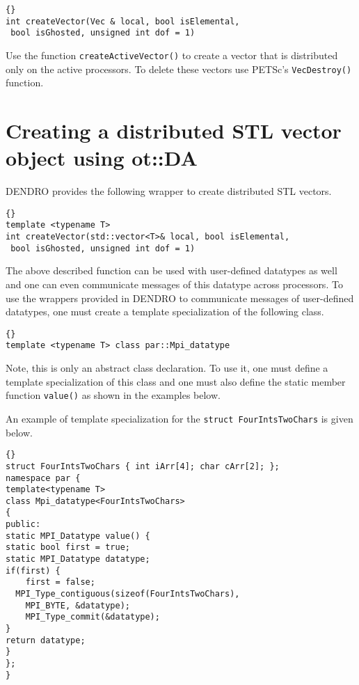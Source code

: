 \documentclass[12pt,reqno,a4paper]{report}
\numberwithin{equation}{section}
\begin{document}
\begin{lstlisting}[frame=trbl, fontadjust]{}
int createVector(Vec & local, bool isElemental,
 bool isGhosted, unsigned int dof = 1)
\end{lstlisting}

Use the function \lstinline[basicstyle=\bfseries]!createActiveVector()! to create a vector that is distributed only on the active processors. To delete these vectors use PETSc's \lstinline[basicstyle=\bfseries]!VecDestroy()! function.

\section{Creating a distributed STL vector object using ot::DA}
\label{sec:stlveccreate}
DENDRO provides the following wrapper to create distributed STL vectors.

\begin{lstlisting}[frame=trbl, fontadjust]{}
template <typename T>
int createVector(std::vector<T>& local, bool isElemental,
 bool isGhosted, unsigned int dof = 1)
\end{lstlisting}

The above described function can be used with user-defined datatypes as well and one can even communicate messages of this datatype across processors. To use the wrappers provided in DENDRO to communicate messages of user-defined datatypes, one must create a template specialization of the following class.

\begin{lstlisting}[frame=trbl, fontadjust]{}
template <typename T> class par::Mpi_datatype
\end{lstlisting}

Note, this is only an abstract class declaration. To use it, one must define a template specialization of this class
 and one must also define the static member function \lstinline[basicstyle=\bfseries]!value()! as
 shown in the examples below.
 
An example of template specialization for the \lstinline[basicstyle=\bfseries]!struct FourIntsTwoChars! is given below.

\begin{lstlisting}[frame=trbl, fontadjust]{}
struct FourIntsTwoChars { int iArr[4]; char cArr[2]; };
namespace par {
template<typename T>
class Mpi_datatype<FourIntsTwoChars>
{
public:
static MPI_Datatype value() {
static bool first = true;
static MPI_Datatype datatype;
if(first) {
	first = false;
  MPI_Type_contiguous(sizeof(FourIntsTwoChars),
	MPI_BYTE, &datatype);
	MPI_Type_commit(&datatype);
}
return datatype;
}
};
}
\end{lstlisting}
\end{document}
